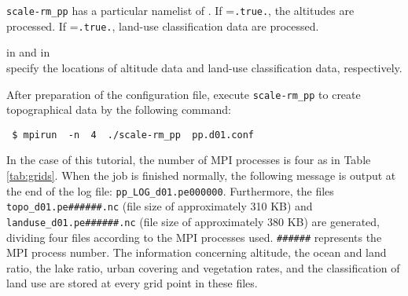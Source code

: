 \verb|scale-rm_pp| has a particular namelist of .
If =\verb|.true.|, the altitudes are processed.
If =\verb|.true.|, land-use classification data are processed.

 in 
and  in\\  specify the locations of altitude data and land-use classification data, respectively.

After preparation of the configuration file,
execute \verb|scale-rm_pp| to create topographical data by the following command:
\begin{verbatim}
 $ mpirun  -n  4  ./scale-rm_pp  pp.d01.conf
\end{verbatim}
In the case of this tutorial, the number of MPI processes is four as in Table \ref{tab:grids}.
When the job is finished normally,
the following message is output at the end of the log file: \verb|pp_LOG_d01.pe000000|.
Furthermore, the files \verb|topo_d01.pe######.nc| (file size of approximately 310 KB)  and\\
\verb|landuse_d01.pe######.nc| (file size of approximately 380 KB)  are generated,
dividing four files according to the MPI processes used.
\verb|######| represents the MPI process number.
The information concerning altitude, the ocean and land ratio, the lake ratio, urban covering and vegetation rates, and the classification of land use are stored at every grid point in these files.

